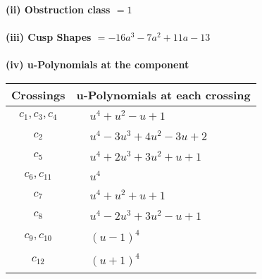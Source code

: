\documentclass[1p]{elsarticle_modified}
\theoremstyle{definition}
\begin{document}
\flushleft \textbf{(ii) Obstruction class $= 1$}\\~\\
\flushleft \textbf{(iii) Cusp Shapes $= -16 a^3-7 a^2+11 a-13$}\\~\\
\newpage\renewcommand{\arraystretch}{1}
\flushleft \textbf{(iv) u-Polynomials at the component}\newline \\
\begin{tabular}{m{50pt}|m{274pt}}
Crossings & \hspace{64pt}u-Polynomials at each crossing \\
\hline $$\begin{aligned}c_{1},c_{3},c_{4}\end{aligned}$$&$\begin{aligned}
&u^4+u^2- u+1
\end{aligned}$\\
\hline $$\begin{aligned}c_{2}\end{aligned}$$&$\begin{aligned}
&u^4-3 u^3+4 u^2-3 u+2
\end{aligned}$\\
\hline $$\begin{aligned}c_{5}\end{aligned}$$&$\begin{aligned}
&u^4+2 u^3+3 u^2+u+1
\end{aligned}$\\
\hline $$\begin{aligned}c_{6},c_{11}\end{aligned}$$&$\begin{aligned}
&u^4
\end{aligned}$\\
\hline $$\begin{aligned}c_{7}\end{aligned}$$&$\begin{aligned}
&u^4+u^2+u+1
\end{aligned}$\\
\hline $$\begin{aligned}c_{8}\end{aligned}$$&$\begin{aligned}
&u^4-2 u^3+3 u^2- u+1
\end{aligned}$\\
\hline $$\begin{aligned}c_{9},c_{10}\end{aligned}$$&$\begin{aligned}
&(u-1)^4
\end{aligned}$\\
\hline $$\begin{aligned}c_{12}\end{aligned}$$&$\begin{aligned}
&(u+1)^4
\end{aligned}$\\
\hline
\end{tabular}\\~\\
\end{document}
